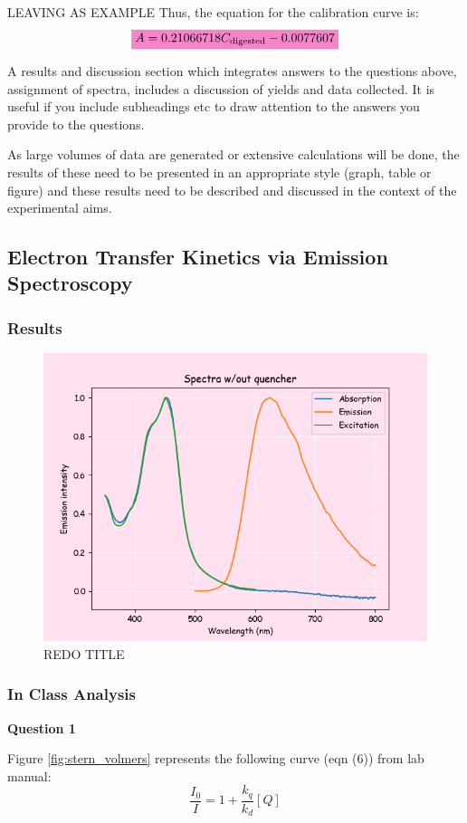 

LEAVING AS EXAMPLE
Thus, the equation for the calibration curve is:
\begin{equation*}
    \mathcolorbox{Lavender}{A = 0.21066718C_{\text{digested}} -0.0077607}
\end{equation*}

A results and discussion section which integrates answers to the questions above, assignment of spectra, 
includes a discussion of yields and data collected. It is useful if you include subheadings etc to draw attention to 
the answers you provide to the questions.

As large volumes of data are generated or extensive calculations will be done, the results of these need 
to be presented in an appropriate style (graph, table or figure) and these results need to be described 
and discussed in the context of the experimental aims.

\subsection{Electron Transfer Kinetics via Emission Spectroscopy}
\subsubsection*{Results}
\begin{figure}[H]
    \centering
    \includegraphics[width = 0.7\linewidth]{part1_noq.png}
    \caption{REDO TITLE}
    \label{fig:enter-label}
\end{figure}
\subsubsection*{In Class Analysis}
\textbf{Question 1} 


Figure \ref{fig:stern_volmers} represents the following curve (eqn (6)) from lab manual\autocite{lab_manual}:
\begin{equation*}
    \frac{I_0}{I} = 1 + \frac{k_q}{k_d}[Q]
\end{equation*}

